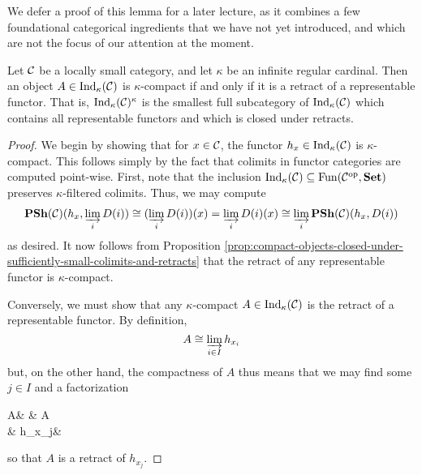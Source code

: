 We defer a proof of this lemma for a later lecture, as it combines a few foundational categorical ingredients that we have not yet introduced, and which are not the focus of our attention at the moment.
\begin{proposition}\label{prop:ind-compact-objects-are-retracts-of-representables}
	Let \(\calC\) be a locally small category, and let \(\kappa\) be an infinite regular cardinal. Then an object \(A\in\Ind_\kappa(\calC)\) is \(\kappa\)-compact if
	and only if it is a retract of a representable functor. That is, \(\Ind_\kappa(\calC)^\kappa\) is the smallest full subcategory of \(\Ind_\kappa(\calC)\) which
	contains all representable functors and which is closed under retracts.
\end{proposition}
\begin{proof}
We begin by showing that for \(x\in\calC\), the functor \(h_x\in\Ind_\kappa(\calC)\) is \(\kappa\)-compact. This follows simply by the fact that colimits in functor categories are
computed point-wise. First, note that the inclusion \(\Ind_\kappa(\calC)\subseteq\Fun(\calC^\op,\Set)\) preserves \(\kappa\)-filtered colimits. Thus, we may compute
\begin{align*}
	\PSh(\calC)(h_x, \injlim_i D(i)) \cong (\injlim_i D(i))(x) = \injlim_i D(i)(x) \cong \injlim_i\PSh(\calC)(h_x,D(i))
\end{align*}
as desired. It now follows from Proposition \ref{prop:compact-objects-closed-under-sufficiently-small-colimits-and-retracts} that the retract of any representable functor is \(\kappa\)-compact.

Conversely, we must show that any \(\kappa\)-compact \(A\in\Ind_\kappa(\calC)\) is the retract of a representable functor. By definition,
\[ A \cong \injlim_{i\in I} h_{x_i} \]
but, on the other hand, the compactness of \(A\) thus means that we may find some \(j\in I\) and a factorization
\begin{diagram*}
	A\ar[rr,equal]\ar[dr] & & A \\
	& h_{x_j}\ar[ur] & 
\end{diagram*}
so that \(A\) is a retract of \(h_{x_j}\).
\end{proof}


